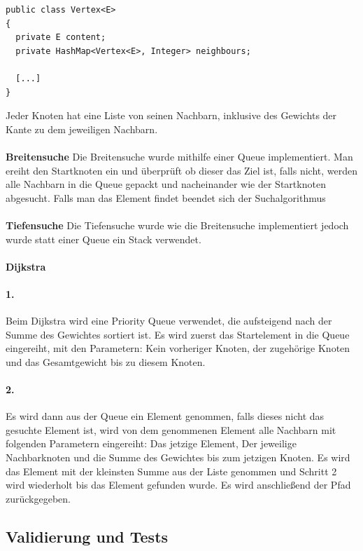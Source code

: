\documentclass[utf8]{article}
\begin{document}
\begin{verbatim}
public class Vertex<E>
{
  private E content;
  private HashMap<Vertex<E>, Integer> neighbours;

  [...]
}
\end{verbatim}
Jeder Knoten hat eine Liste von seinen Nachbarn, inklusive des
Gewichts der Kante zu dem jeweiligen Nachbarn.\\\\
\textbf{Breitensuche} \label{Breitensuche}
Die Breitensuche wurde mithilfe einer Queue implementiert.
Man ereiht den Startknoten ein und überprüft ob dieser das Ziel ist,
falls nicht, werden alle Nachbarn in die Queue gepackt und nacheinander
wie der Startknoten abgesucht. Falls man das Element findet beendet sich der Suchalgorithmus\\
\\
\textbf{Tiefensuche}
Die Tiefensuche wurde wie die Breitensuche implementiert jedoch wurde
statt einer Queue ein Stack verwendet. \\
\\
\textbf{Dijkstra}
\paragraph{1.}
Beim Dijkstra wird eine Priority Queue verwendet, die aufsteigend nach
der Summe des Gewichtes sortiert ist.
Es wird zuerst das Startelement in die Queue eingereiht,
mit den Parametern: Kein vorheriger Knoten,
der zugehörige Knoten und das Gesamtgewicht bis zu diesem Knoten.
\paragraph{2.} Es wird dann aus der Queue ein Element genommen, falls dieses nicht das gesuchte
Element ist, wird von dem genommenen Element alle Nachbarn mit folgenden
Parametern eingereiht: Das jetzige Element, Der jeweilige Nachbarknoten
und die Summe des Gewichtes bis zum jetzigen Knoten. Es wird das Element mit der kleinsten Summe
aus der Liste genommen und Schritt 2 wird wiederholt bis das Element
gefunden wurde. Es wird anschließend der Pfad zurückgegeben.

\subsection{Validierung und Tests}
\end{document}
